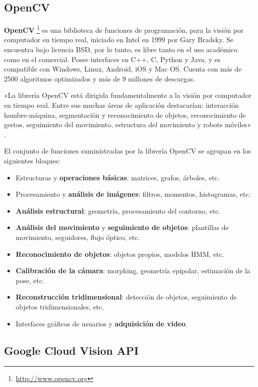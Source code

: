 \subsection{OpenCV}
\label{sec:opencv}

\textbf{OpenCV} \footnote{\url{http://www.opencv.org}} es una biblioteca de funciones de programación, para la visión por computador 
en tiempo real, iniciado en Intel en 1999 por Gary Bradsky. Se encuentra bajo licencia BSD, por lo tanto, es libre tanto en el uso
académico como en el comercial. Posee interfaces en C++, C, Python y Java, y es compatible con Windows, Linux, Android, iOS y Mac OS.
Cuenta con más de 2500 algoritmos optimizados y más de 9 millones de descargas.

«La librería OpenCV está dirigida fundamentalmente a la visión por computador en tiempo real. Entre sus muchas áreas de 
aplicación destacarían: interacción hombre-máquina, segmentación y reconocimiento de objetos, reconocimiento de gestos, 
seguimiento del movimiento, estructura del movimiento y robots móviles» \cite{opencv}.

El  conjunto  de  funciones   suministradas por la librería OpenCV se agrupan en los siguientes bloques: 
\begin{itemize}
\item Estructuras y \textbf{operaciones básicas}: matrices, grafos, árboles, etc.
\item Procesamiento y \textbf{análisis de imágenes}: filtros, momentos, histogramas, etc.
\item \textbf{Análisis estructural}: geometría, procesamiento del contorno, etc.
\item \textbf{Análisis del movimiento} y \textbf{seguimiento de objetos}: plantillas  de  movimiento, seguidores, flujo óptico, etc.
\item \textbf{Reconocimiento de objetos}: objetos propios, modelos \acs{HMM}, etc.
\item \textbf{Calibración de la cámara}: morphing, geometría epipolar, estimación de la pose, etc.
\item \textbf{Reconstrucción tridimensional}: detección de objetos, seguimiento de objetos tridimensionales, etc.
\item Interfaces gráficos de usuarios y \textbf{adquisición de video}.
\end{itemize}

\subsection{Google Cloud Vision API}
\label{sec:visionapi}

